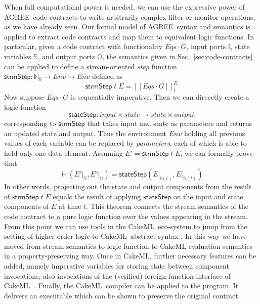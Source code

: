 \documentclass[global,twocolumn]{svjour}
\newcommand{\konst}[1]{\ensuremath{\mathsf{#1}}}
\newcommand{\sem}[1]{\ensuremath{[\![ #1 ]\!]}}
\newcommand{\Eqs}{\ensuremath{\mathit{Eqs}}}
\newcommand{\secref}[1]{Sec.~\ref{#1}}
\newcommand{\agr}{AGREE}
\newcommand{\ckml}{CakeML}
\begin{document}
When full computational power is needed, we can use the expressive power of \agr\ code contracts to write arbitrarily complex filter or monitor operations, as we have already seen.
%
Our formal model of \agr\ syntax and semantics is applied to extract code contracts and map them to equivalent logic functions.
%
In particular, given a code contract with functionality ${\Eqs}\cdot G$, input ports $\mathbb{I}$, state variables $\mathbb{S}$, and output ports $\mathbb{O}$, the semantics given in \secref{sec:code-contracts} can be applied to define a stream-oriented \emph{step} function $\konst{strmStep} : \mathbb{N}_0 \to \mathit{Env} \to \mathit{Env}$ defined as
%
\[
 \konst{strmStep}\;t \; E = \sem{\mathit{Eqs} \cdot G}^E_t
\]
%
Now suppose ${\Eqs}\cdot G$ is sequentially imperative.
%
Then we can direcctly create a logic function
%
\[
\konst{stateStep} : \mathit{input} \times \mathit{state} \to \mathit{state} \times \mathit{output}
\]
%
corresponding to \konst{strmStep} that takes input and state as parameters and returns an updated state and output.
%
Thus the environment $\mathit{Env}$ holding all previous values of each variable can be replaced by \emph{parameters}, each of which is able to hold only one data element.
%
Assuming $\mathit{E}' = \konst{strmStep}\;t\; \mathit{E}$, we can formally prove that
%
\[
\vdash (\mathit{E}' \vert_{\mathbb{S}},
 \mathit{E}' \vert_{\mathbb{O}}) =
\konst{stateStep} (\mathit{E}\vert_{\mathbb{I}(t)},
                   \mathit{E}\vert_{\mathbb{S}(t)})
\]
%
In other words, projecting out the state and output components from the result of $\konst{strmStep}\;t\; \mathit{E}$ equals the result of applying \konst{stateStep} on the input and state components of $\mathit{E}$ at time $t$.
%
This theorem connects the stream semantics of the code contract to a pure logic function over the values appearing in the stream.
%
From this point we can use tools in the \ckml\ eco-system to jump from the setting of higher order logic to \ckml\ abstract syntax \cite{cakeml-translator}.
%
In this way we have moved from stream semantics to logic function to CakeML evaluation semantics in a property-preserving way.
%
Once in \ckml, further necessary features can be added, namely imperative variables for storing state between component invocations, also invocations of the (verified) foreign function interface of \ckml\ \cite{cakeml-monadic}.
%
Finally, the \ckml\ compiler can be applied to the program.
%
It delivers an executable which can be shown to preserve the original contract.

\end{document}
